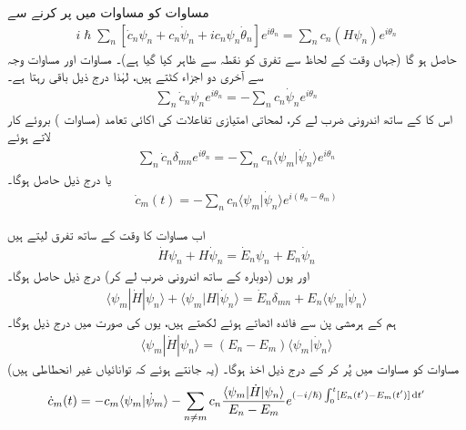  مساوات  کو مساوات  میں پر کرنے سے
\begin{align}
i \hslash \sum_n [\dot{c}_n \psi_n + c_n \dot{\psi}_n + i c_n \psi_n \dot{\theta}_n] e^{i \theta_n} = \sum_n c_n (H \psi_n) e^{i \theta_n} 
\end{align}
حاصل ہو گا (جہاں وقت کے لحاظ سے تفرق کو نقطہ سے ظاہر کیا گیا ہے)۔ مساوات  اور مساوات  وجہ سے آخری دو اجزاء کٹتے ہیں، لہٰذا درج ذیل باقی رہتا ہے۔ 
\begin{align}
\sum_n \dot{c}_n \psi_n e^{i \theta_n} = - \sum_n c_n \dot{\psi}_n e^{i \theta_n}
\end{align}
اس کا  کے ساتھ اندرونی ضرب لے کر، لمحاتی امتیازی تفاعلات کی اکائی تعامد (مساوات ) بروئے کار لاتے ہوئے 
\begin{align*}
\sum_n \dot{c}_n \delta_{mn} e^{i \theta_n} = - \sum_n c_n \langle \psi_m | \dot{\psi}_n \rangle e^{i \theta_n}
\end{align*}
یا درج ذیل حاصل ہوگا۔ 
\begin{align}\label{مساوات_حر_تفرق_عددی_سر}
\dot{c}_m (t) = - \sum_n c_n \langle \psi_m | \dot{\psi}_n \rangle e^{i(\theta_n - \theta_m)}
\end{align}

اب مساوات  کا وقت کے ساتھ تفرق لیتے ہیں 
\begin{align*}
\dot{H} \psi_n + H \dot{\psi}_n = \dot{E}_n \psi_n + E_n \dot{\psi}_n
\end{align*}
اور یوں (دوبارہ  کے ساتھ اندرونی ضرب لے کر) درج ذیل حاصل ہوگا۔ 
\begin{align}
\langle \psi_m | \dot{H} | \psi_n \rangle + \langle \psi_m | H | \dot{\psi}_n \rangle = \dot{E}_n \delta_{mn} + E_n \langle \psi_m | \dot{\psi}_n \rangle
\end{align} 
ہم  کے ہرمشی پن سے فائدہ اٹھاتے ہوئے  لکھتے ہیں، یوں  کی صورت میں درج ذیل ہوگا۔
\begin{align}\label{مساوات_حر_نابرابر_صورت}
\langle \psi_m | \dot{H} | \psi_n \rangle = (E_n - E_m) \langle \psi_m | \dot{\psi}_n \rangle
\end{align}
(یہ جانتے ہوئے کہ توانائیاں غیر انحطاطی ہیں) مساوات  کو مساوات  میں پُر کر کے درج ذیل اخذ ہوگا۔
\begin{align}
\dot{c}_m (t) = - c_m \langle \psi_m | \dot{\psi}_m \rangle - \sum_{n \ne m} c_n \frac{\langle \psi_m | \dot{H} | \psi_n \rangle}{E_n - E_m} e ^{(- i / \hslash) \int_0^t [E_n(t') - E_m(t')] \dif t' }
\end{align}

